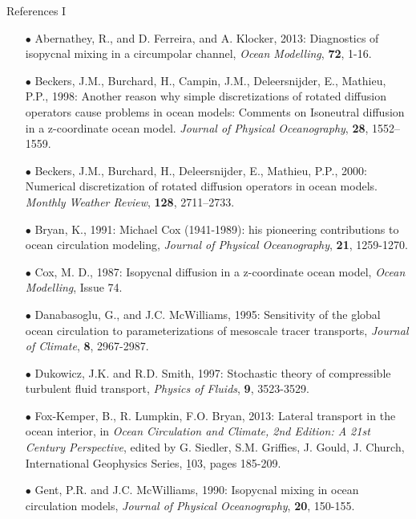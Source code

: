 \documentclass{beamer}
\begin{document}
\begin{frame}{References I}

\begin{itemize}
\tiny

\item[$\bullet$] Abernathey, R., and D. Ferreira, and A.  Klocker, 2013:  Diagnostics of isopycnal mixing in a circumpolar channel, {\it Ocean Modelling}, {\bf 72}, 1-16.

\item[$\bullet$] Beckers, J.M., Burchard, H., Campin, J.M., Deleersnijder, E., Mathieu, P.P., 1998: Another reason why simple discretizations of rotated diffusion operators cause problems in ocean models: Comments on Isoneutral diffusion in a z-coordinate ocean model. {\it Journal of Physical  Oceanography}, {\bf 28}, 1552–1559.

\item[$\bullet$] Beckers, J.M., Burchard, H., Deleersnijder, E., Mathieu, P.P., 2000: Numerical discretization of rotated diffusion operators in ocean models. {\it Monthly Weather Review}, {\bf 128}, 2711–2733.

\item[$\bullet$] Bryan, K., 1991: Michael Cox (1941-1989): his pioneering contributions to ocean circulation modeling, {\it Journal of Physical Oceanography}, {\bf 21}, 1259-1270.

\item[$\bullet$] Cox, M. D., 1987: Isopycnal diffusion in a z-coordinate ocean model, {\it Ocean Modelling}, Issue 74. 

\item[$\bullet$] Danabasoglu, G., and J.C. McWilliams, 1995: Sensitivity of the global ocean circulation to 
parameterizations of mesoscale tracer transports, {\it Journal of Climate}, {\bf 8},  2967-2987.

\item[$\bullet$] Dukowicz, J.K. and R.D. Smith, 1997:  
Stochastic theory of compressible turbulent fluid transport, {\it Physics of Fluids}, {\bf 9}, 3523-3529.

\item[$\bullet$] Fox-Kemper, B., R. Lumpkin, F.O. Bryan, 2013: Lateral transport in the ocean interior, in 
{\it Ocean Circulation and Climate, 2nd Edition: A 21st Century Perspective}, edited by G. Siedler,  S.M. Griffies, J. Gould, J. Church, International Geophysics Series, {\b 103}, pages 185-209.

\item[$\bullet$] Gent, P.R. and J.C. McWilliams, 1990: 
Isopycnal mixing in ocean circulation models, {\it Journal of Physical Oceanography}, {\bf 20}, 150-155.


\end{itemize}
\end{frame}
\end{document}
